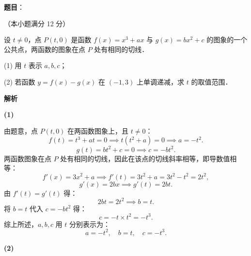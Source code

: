 \begin{answer}

\textbf{题目}：

（本小题满分 12 分）

设 $t \neq 0$，点 $P(t, 0)$ 是函数 $f(x) = x^3 + ax$ 与 $g(x) = bx^2 + c$ 的图象的一个公共点，两函数的图象在点 $P$ 处有相同的切线．

(1) 用 $t$ 表示 $a, b, c$；

(2) 若函数 $y = f(x) - g(x)$ 在 $(-1, 3)$ 上单调递减，求 $t$ 的取值范围．

\textbf{解析}

\textbf{(1)}

由题意，点 $P(t, 0)$ 在两函数图象上，且 $t \neq 0$：
\nopagebreak[4]
\[
f(t) = t^3 + at = 0 \implies t(t^2 + a) = 0 \implies a = -t^2.
\]
\nopagebreak[4]
\[
g(t) = bt^2 + c = 0 \implies c = -bt^2.
\]
两函数图象在点 $P$ 处有相同的切线，因此在该点的切线斜率相等，即导数值相等：
\nopagebreak[4]
\[
f'(x) = 3x^2 + a \implies f'(t) = 3t^2 + a = 3t^2 - t^2 = 2t^2,
\]
\nopagebreak[4]
\[
g'(x) = 2bx \implies g'(t) = 2bt.
\]
由 $f'(t) = g'(t)$ 得：
\nopagebreak[4]
\[
2bt = 2t^2 \implies b = t.
\]
将 $b = t$ 代入 $c = -bt^2$ 得：
\nopagebreak[4]
\[
c = -t \times t^2 = -t^3.
\]
综上所述，$a, b, c$ 用 $t$ 分别表示为：
\nopagebreak[4]
\[
a = -t^2, \quad b = t, \quad c = -t^3.
\]

\textbf{(2)}


\end{answer}
